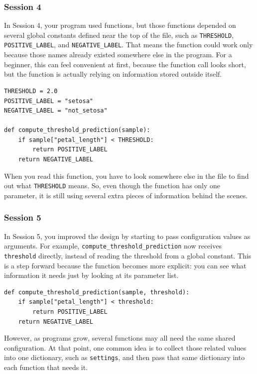 \subsubsection{Session 4}
In Session 4, your program used functions, but those functions depended on several global constants defined near the top of the file, such as \texttt{THRESHOLD}, \texttt{POSITIVE\_LABEL}, and \texttt{NEGATIVE\_LABEL}.
That means the function could work only because those names already existed somewhere else in the program.
For a beginner, this can feel convenient at first, because the function call looks short, but the function is actually relying on information stored outside itself.

\begin{verbatim}
THRESHOLD = 2.0
POSITIVE_LABEL = "setosa"
NEGATIVE_LABEL = "not_setosa"

def compute_threshold_prediction(sample):
    if sample["petal_length"] < THRESHOLD:
        return POSITIVE_LABEL
    return NEGATIVE_LABEL
\end{verbatim}

\noindent
When you read this function, you have to look somewhere else in the file to find out what \texttt{THRESHOLD} means.
So, even though the function has only one parameter, it is still using several extra pieces of information behind the scenes.

\subsubsection{Session 5}
In Session 5, you improved the design by starting to pass configuration values as arguments.
For example, \texttt{compute\_threshold\_prediction} now receives \texttt{threshold} directly, instead of reading the threshold from a global constant.
This is a step forward because the function becomes more explicit: you can see what information it needs just by looking at its parameter list.

\begin{verbatim}
def compute_threshold_prediction(sample, threshold):
    if sample["petal_length"] < threshold:
        return POSITIVE_LABEL
    return NEGATIVE_LABEL
\end{verbatim}

\noindent
However, as programs grow, several functions may all need the same shared configuration.
At that point, one common idea is to collect those related values into one dictionary, such as \texttt{settings}, and then pass that same dictionary into each function that needs it.

